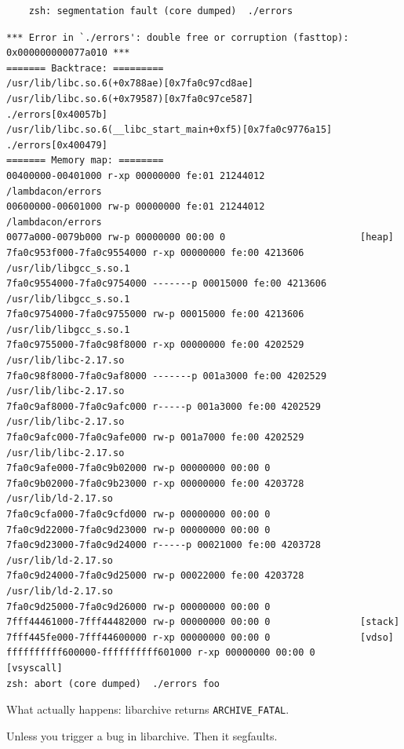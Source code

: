 \documentclass{beamer}
\begin{document}
\begin{frame}[fragile]
  \begin{verbatim}
    zsh: segmentation fault (core dumped)  ./errors
  \end{verbatim}
\end{frame}

\begin{frame}[fragile]
  \begin{verbatim}
*** Error in `./errors': double free or corruption (fasttop): 0x000000000077a010 ***
======= Backtrace: =========
/usr/lib/libc.so.6(+0x788ae)[0x7fa0c97cd8ae]
/usr/lib/libc.so.6(+0x79587)[0x7fa0c97ce587]
./errors[0x40057b]
/usr/lib/libc.so.6(__libc_start_main+0xf5)[0x7fa0c9776a15]
./errors[0x400479]
======= Memory map: ========
00400000-00401000 r-xp 00000000 fe:01 21244012                 /lambdacon/errors
00600000-00601000 rw-p 00000000 fe:01 21244012                 /lambdacon/errors
0077a000-0079b000 rw-p 00000000 00:00 0                        [heap]
7fa0c953f000-7fa0c9554000 r-xp 00000000 fe:00 4213606          /usr/lib/libgcc_s.so.1
7fa0c9554000-7fa0c9754000 -------p 00015000 fe:00 4213606          /usr/lib/libgcc_s.so.1
7fa0c9754000-7fa0c9755000 rw-p 00015000 fe:00 4213606          /usr/lib/libgcc_s.so.1
7fa0c9755000-7fa0c98f8000 r-xp 00000000 fe:00 4202529          /usr/lib/libc-2.17.so
7fa0c98f8000-7fa0c9af8000 -------p 001a3000 fe:00 4202529          /usr/lib/libc-2.17.so
7fa0c9af8000-7fa0c9afc000 r-----p 001a3000 fe:00 4202529          /usr/lib/libc-2.17.so
7fa0c9afc000-7fa0c9afe000 rw-p 001a7000 fe:00 4202529          /usr/lib/libc-2.17.so
7fa0c9afe000-7fa0c9b02000 rw-p 00000000 00:00 0
7fa0c9b02000-7fa0c9b23000 r-xp 00000000 fe:00 4203728          /usr/lib/ld-2.17.so
7fa0c9cfa000-7fa0c9cfd000 rw-p 00000000 00:00 0
7fa0c9d22000-7fa0c9d23000 rw-p 00000000 00:00 0
7fa0c9d23000-7fa0c9d24000 r-----p 00021000 fe:00 4203728          /usr/lib/ld-2.17.so
7fa0c9d24000-7fa0c9d25000 rw-p 00022000 fe:00 4203728          /usr/lib/ld-2.17.so
7fa0c9d25000-7fa0c9d26000 rw-p 00000000 00:00 0
7fff44461000-7fff44482000 rw-p 00000000 00:00 0                [stack]
7fff445fe000-7fff44600000 r-xp 00000000 00:00 0                [vdso]
ffffffffff600000-ffffffffff601000 r-xp 00000000 00:00 0        [vsyscall]
zsh: abort (core dumped)  ./errors foo
\end{verbatim}
\end{frame}

\begin{frame}
  What actually happens: libarchive returns \texttt{ARCHIVE\_FATAL}.\pause

  Unless you trigger a bug in libarchive. \pause
  \alert{Then it segfaults.}
\end{frame}
\end{document}
